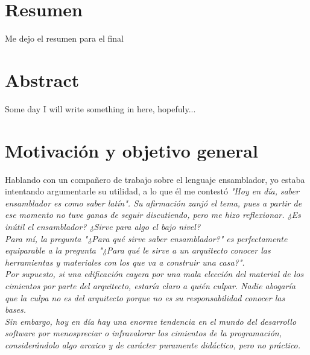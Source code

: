 
\chapter*{Resumen}
\thispagestyle{empty}
Me dejo el resumen para el final

\chapter*{Abstract}
\thispagestyle{empty}
Some day I will write something in here, hopefuly...

\chapter*{Motivación y objetivo general}

\thispagestyle{empty}
\vspace{1cm}

Hablando con un compañero de trabajo sobre el lenguaje ensamblador,
yo estaba intentando argumentarle su utilidad, a lo que él me contestó 
\em{"Hoy en día, saber ensamblador es como saber latín"}.
Su afirmación zanjó el tema, pues a partir de ese momento no tuve ganas de
seguir discutiendo, pero me hizo reflexionar. ¿Es inútil el ensamblador?
¿Sirve para algo el bajo nivel?\\
Para mí, la pregunta \em{"¿Para qué sirve saber ensamblador?"} es perfectamente equiparable a la pregunta \em{"¿Para qué le sirve a un arquitecto conocer las herramientas y materiales con los que va a construir una casa?"}.\\
Por supuesto, si una edificación cayera por una mala elección del material de los cimientos por parte del arquitecto, estaría claro a quién culpar. Nadie abogaría que la culpa no es del arquitecto porque no es su responsabilidad conocer las bases.\\
Sin embargo, hoy en día hay una enorme tendencia en el mundo del desarrollo software por menospreciar o infravalorar los cimientos de la programación, considerándolo algo arcaico y de carácter puramente didáctico, pero no
práctico.\\ 

